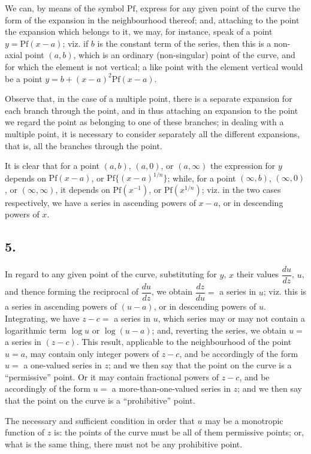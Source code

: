 \documentclass[11pt,a4paper]{book}
\providecommand{\Pf}{\mathrm{Pf}}
\begin{document}
We can, by means of the symbol $\Pf$, express for any given point of the curve the form of the expansion in the neighbourhood thereof; and, attaching to the point the expansion which belongs to it, we may, for instance, speak of a point $y = \Pf(x - a)$; viz. if $b$ is the constant term of the series, then this is a non-axial point $(a, b)$, which is an ordinary (non-singular) point of the curve, and for which the element is not vertical; a like point with the element vertical would be a point $y = b + (x - a)^2 \Pf(x - a)$.

Observe that, in the case of a multiple point, there is a separate expansion for each branch through the point, and in thus attaching an expansion to the point we regard the point as belonging to one of these branches; in dealing with a multiple point, it is necessary to consider separately all the different expansions, that is, all the branches through the point.

It is clear that for a point $(a, b)$, $(a, 0)$, or $(a, \infty)$ the expression for $y$ depends on $\Pf(x - a)$, or $\Pf\{(x - a)^{1/n}\}$; while, for a point $(\infty, b)$, $(\infty, 0)$, or $(\infty, \infty)$, it depends on $\Pf(x^{-1})$, or $\Pf(x^{1/n})$; viz. in the two cases respectively, we have a series in ascending powers of $x - a$, or in descending powers of $x$.

\subsection*{5.}

In regard to any given point of the curve, substituting for $y$, $x$ their values $\dfrac{du}{dz}$, $u$, and thence forming the reciprocal of $\dfrac{du}{dz}$, we obtain $\dfrac{dz}{du} =$ a series in $u$; viz. this is a series in ascending powers of $(u - a)$, or in descending powers of $u$. Integrating, we have $z - c =$ a series in $u$, which series may or may not contain a logarithmic term $\log u$ or $\log(u - a)$; and, reverting the series, we obtain $u =$ a series in $(z - c)$. This result, applicable to the neighbourhood of the point $u = a$, may contain only integer powers of $z-c$, and be accordingly of the form $u =$ a one-valued series in $z$; and we then say that the point on the curve is a ``permissive'' point. Or it may contain fractional powers of $z-c$, and be accordingly of the form $u =$ a more-than-one-valued series in $z$; and we then say that the point on the curve is a ``prohibitive'' point.

The necessary and sufficient condition in order that $u$ may be a monotropic function of $z$ is: the points of the curve must be all of them permissive points; or, what is the same thing, there must not be any prohibitive point.
\end{document}
